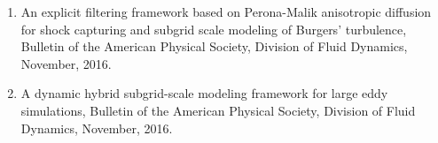 \documentclass[letterpaper]{article}
\renewenvironment{itemize}{
  \begin{list}{}{
    \setlength{\leftmargin}{1.5em}
  }
}{
  \end{list}
}
\begin{document}
\begin{enumerate}
\item An explicit filtering framework based on Perona-Malik anisotropic diffusion for shock capturing and subgrid scale modeling of Burgers' turbulence, Bulletin of the American Physical Society, Division of Fluid Dynamics, November, 2016.

\item A dynamic hybrid subgrid-scale modeling framework for large eddy simulations, Bulletin of the American Physical Society, Division of Fluid Dynamics, November, 2016.

\end{enumerate}






    
    
    
\end{document}
